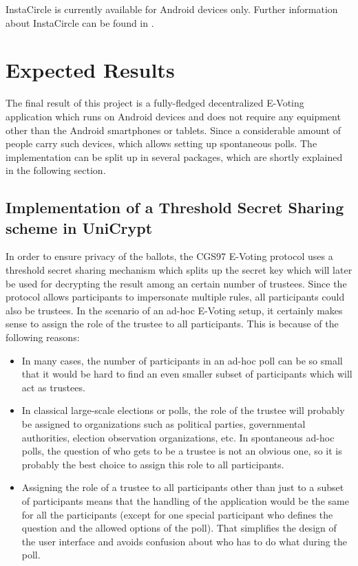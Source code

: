 \documentclass[numbers=noenddot, abstract=on, a4paper, headsepline,
footsepline, oneside, draft=off]{scrreprt}
\begin{document}
InstaCircle is currently available for Android devices only. Further information
about InstaCircle can be found in \cite{ritter13a}.

\chapter{Expected Results}
\label{cha:expectedresults}
The final result of this project is a fully-fledged decentralized E-Voting
application which runs on Android devices and does not require any equipment
other than the Android smartphones or tablets. Since a considerable amount of
people carry such devices, which allows setting up spontaneous polls. The
implementation can be split up in several packages, which are shortly explained
in the following section.

\section{Implementation of a Threshold Secret Sharing scheme in UniCrypt}
\label{sec:thresholdsecretsharing}
In order to ensure privacy of the ballots, the CGS97 \cite{CGS97} E-Voting
protocol uses a threshold secret sharing mechanism which splits up the secret
key which will later be used for decrypting the result among an certain number
of trustees. Since the protocol allows participants to impersonate multiple
rules, all participants could also be trustees. In the scenario of an ad-hoc
E-Voting setup, it certainly makes sense to assign the role of the trustee to
all participants. This is because of the following reasons:
\begin{itemize}
  \item In many cases, the number of participants in an ad-hoc poll can be so
  small that it would be hard to find an even smaller subset of participants
  which will act as trustees.
  \item In classical large-scale elections or polls, the role of the trustee
  will probably be assigned to organizations such as political parties,
  governmental authorities, election observation organizations, etc. In
  spontaneous ad-hoc polls, the question of who gets to be a trustee is not an
  obvious one, so it is probably the best choice to assign this role to all
  participants.
  \item Assigning the role of a trustee to all participants other than just to a
  subset of participants means that the handling of the application would be the
  same for all the participants (except for one special participant who defines
  the question and the allowed options of the poll). That simplifies the design
  of the user interface and avoids confusion about who has to do what during the
  poll.
\end{itemize}
\end{document}
